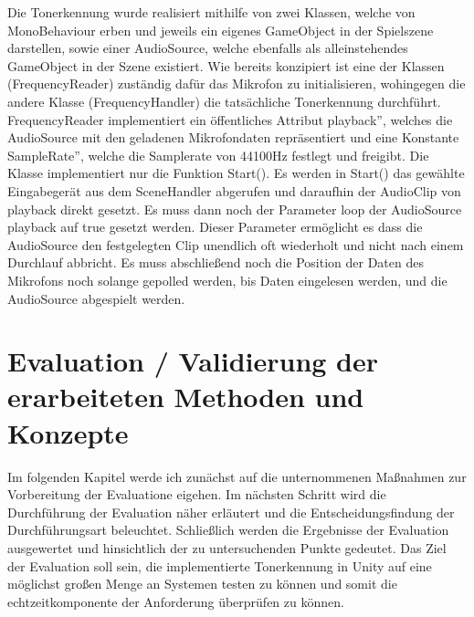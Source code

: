 Die Tonerkennung wurde realisiert mithilfe von zwei Klassen, welche von MonoBehaviour erben und jeweils ein eigenes GameObject in der Spielszene darstellen, sowie einer AudioSource, welche ebenfalls als alleinstehendes GameObject in der Szene existiert. Wie bereits konzipiert ist eine der Klassen (FrequencyReader) zuständig dafür das Mikrofon zu initialisieren, wohingegen die andere Klasse (FrequencyHandler) die tatsächliche Tonerkennung durchführt. \\
FrequencyReader implementiert ein öffentliches Attribut \glqq playback'', welches die AudioSource mit den geladenen Mikrofondaten repräsentiert und eine Konstante \glqq SampleRate'', welche die Samplerate von 44100Hz festlegt und freigibt. Die Klasse implementiert nur die Funktion Start(). Es werden in Start() das gewählte Eingabegerät aus dem SceneHandler abgerufen und daraufhin der AudioClip von playback direkt gesetzt. Es muss dann noch der Parameter loop der AudioSource playback auf true gesetzt werden. Dieser Parameter ermöglicht es dass die AudioSource den festgelegten Clip unendlich oft wiederholt und nicht nach einem Durchlauf abbricht. Es muss abschließend noch die Position der Daten des Mikrofons noch solange gepolled werden, bis Daten eingelesen werden, und die AudioSource abgespielt werden. 

\chapter{Evaluation / Validierung der erarbeiteten Methoden und Konzepte}

Im folgenden Kapitel werde ich zunächst auf die unternommenen Maßnahmen zur Vorbereitung der Evaluatione eigehen. Im nächsten Schritt wird die Durchführung der Evaluation näher erläutert und die Entscheidungsfindung der Durchführungsart beleuchtet. Schließlich werden die Ergebnisse der Evaluation ausgewertet und hinsichtlich der zu untersuchenden Punkte gedeutet.  Das Ziel der Evaluation soll sein, die implementierte Tonerkennung in Unity auf eine möglichst großen Menge an Systemen testen zu können und somit die echtzeitkomponente der Anforderung überprüfen zu können. 
